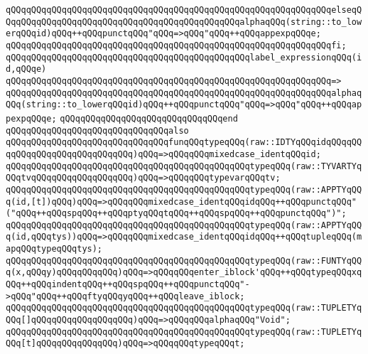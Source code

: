 \verb|qQQqqQQqqQQqqQQqqQQqqQQqqQQqqQQqqQQqqQQqqQQqqQQqqQQqqQQqqQQqqQQqelseqQQqqQQqqQQqqQQqqQQqqQQqqQQqqQQqqQQqqQQqqQQqqQQqalphaqQQq(string::to_lowerqQQqid)qQQq++qQQqpunctqQQq"qQQq=>qQQq"qQQq++qQQqappexpqQQqe;|\newline
\verb|qQQqqQQqqQQqqQQqqQQqqQQqqQQqqQQqqQQqqQQqqQQqqQQqqQQqqQQqqQQqqQQqfi;|\newline
\newline
\verb|qQQqqQQqqQQqqQQqqQQqqQQqqQQqqQQqqQQqqQQqqQQqqQQqlabel_expressionqQQq(id,qQQqe)|\newline
\verb|qQQqqQQqqQQqqQQqqQQqqQQqqQQqqQQqqQQqqQQqqQQqqQQqqQQqqQQqqQQqqQQq=>|\newline
\verb|qQQqqQQqqQQqqQQqqQQqqQQqqQQqqQQqqQQqqQQqqQQqqQQqqQQqqQQqqQQqqQQqalphaqQQq(string::to_lowerqQQqid)qQQq++qQQqpunctqQQq"qQQq=>qQQq"qQQq++qQQqappexpqQQqe;|\newline
\verb|qQQqqQQqqQQqqQQqqQQqqQQqqQQqqQQqend|\newline
\newline
\verb|qQQqqQQqqQQqqQQqqQQqqQQqqQQqqQQqalso|\newline
\verb|qQQqqQQqqQQqqQQqqQQqqQQqqQQqqQQqfunqQQqtypeqQQq(raw::IDTYqQQqidqQQqqQQqqQQqqQQqqQQqqQQqqQQqqQQq)qQQq=>qQQqqQQqmixedcase_identqQQqid;|\newline
\verb|qQQqqQQqqQQqqQQqqQQqqQQqqQQqqQQqqQQqqQQqqQQqqQQqtypeqQQq(raw::TYVARTYqQQqtvqQQqqQQqqQQqqQQqqQQq)qQQq=>qQQqqQQqtypevarqQQqtv;|\newline
\verb|qQQqqQQqqQQqqQQqqQQqqQQqqQQqqQQqqQQqqQQqqQQqqQQqtypeqQQq(raw::APPTYqQQq(id,[t])qQQq)qQQq=>qQQqqQQqmixedcase_identqQQqidqQQq++qQQqpunctqQQq"("qQQq++qQQqspqQQq++qQQqptyqQQqtqQQq++qQQqspqQQq++qQQqpunctqQQq")";|\newline
\verb|qQQqqQQqqQQqqQQqqQQqqQQqqQQqqQQqqQQqqQQqqQQqqQQqtypeqQQq(raw::APPTYqQQq(id,qQQqtys))qQQq=>qQQqqQQqmixedcase_identqQQqidqQQq++qQQqtupleqQQq(mapqQQqtypeqQQqtys);|\newline
\verb|qQQqqQQqqQQqqQQqqQQqqQQqqQQqqQQqqQQqqQQqqQQqqQQqtypeqQQq(raw::FUNTYqQQq(x,qQQqy)qQQqqQQqqQQq)qQQq=>qQQqqQQqenter_iblock'qQQq++qQQqtypeqQQqxqQQq++qQQqindentqQQq++qQQqspqQQq++qQQqpunctqQQq"->qQQq"qQQq++qQQqftyqQQqyqQQq++qQQqleave_iblock;|\newline
\verb|qQQqqQQqqQQqqQQqqQQqqQQqqQQqqQQqqQQqqQQqqQQqqQQqtypeqQQq(raw::TUPLETYqQQq[]qQQqqQQqqQQqqQQqqQQq)qQQq=>qQQqqQQqalphaqQQq"Void";|\newline
\verb|qQQqqQQqqQQqqQQqqQQqqQQqqQQqqQQqqQQqqQQqqQQqqQQqtypeqQQq(raw::TUPLETYqQQq[t]qQQqqQQqqQQqqQQq)qQQq=>qQQqqQQqtypeqQQqt;|\newline

